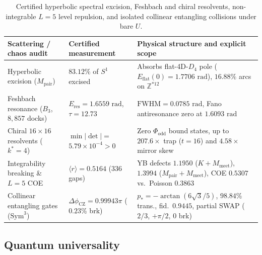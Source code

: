 \begin{table}[tb]
\centering
\caption{Certified hyperbolic spectral excision, Feshbach and chiral resolvents, non-integrable $L = 5$ level repulsion,
and isolated collinear entangling collisions under bare $U$.}
\label{tab:scattering-gates}
\footnotesize
\begin{tabularx}{\textwidth}{@{}>{\raggedright\arraybackslash}p{3.95cm}>{\raggedright\arraybackslash}p{3.45cm}>{\raggedright\arraybackslash}X@{}}
\toprule
Scattering / chaos audit & Certified measurement & Physical structure and explicit scope \\
\midrule
Hyperbolic excision ($M_{\mathrm{pair}}$) & $83.12\%$ of $S^1$ excised & Absorbs flat-4D-$D_4$ pole ($E_{\mathrm{flat}}(0) = 1.7706\text{ rad}$), $16.88\%$ arcs on $\mathbb{Z}^{*12}$ \\
Feshbach resonance ($B_3$, $8{,}857$ docks) & $E_{\mathrm{res}} = 1.6559\text{ rad}$, $\tau = 12.73$ & $\mathrm{FWHM} = 0.0785\text{ rad}$, Fano antiresonance zero at $1.6093\text{ rad}$ \\
Chiral $16 \times 16$ resolvents ($k^* = 4$) & $\min|\det| =$ \mbox{$5.79 \times 10^{-4} > 0$} & Zero $\Phi_{\mathrm{odd}}$ bound states, up to $207.6\times$ trap ($t = 16$) and $4.58\times$ mirror skew \\
Integrability breaking \& $L = 5$ COE & $\langle r \rangle = 0.5164$ ($336$ gaps) & YB defects $1.1950$ ($K{+}M_{\mathrm{meet}}$), $1.3994$ ($M_{\mathrm{pair}}{+}M_{\mathrm{meet}}$), COE $0.5307$ vs.\ Poisson $0.3863$ \\
Collinear entangling gates ($\mathrm{Sym}^3$) & $\Delta\phi_{\mathrm{CZ}} = 0.99943\pi$ ($0.23\%$ brk) & $p_* = -\arctan(6\sqrt{3}/5)$, $98.84\%$ trans., fid.\ $0.9445$, partial SWAP ($2/3$, $+\pi/2$, $0$ brk) \\
\bottomrule
\end{tabularx}
\end{table}

\subsection{Quantum universality}


